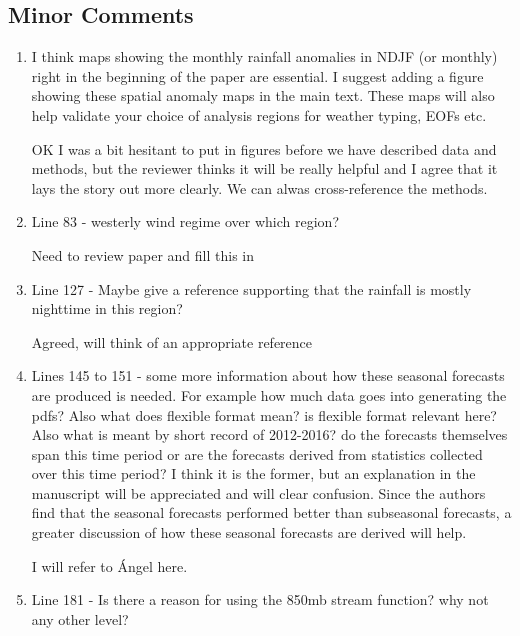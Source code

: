 \documentclass{article}
\newenvironment{answer}{\begin{mdframed}}{\end{mdframed}}
\begin{document}
\subsection{Minor Comments}

\begin{enumerate}
	\item I think maps showing the monthly rainfall anomalies in NDJF (or monthly) right in the beginning of the paper are essential. I suggest adding a figure showing these spatial anomaly maps in the main text. These maps will also help validate your choice of analysis regions for weather typing, EOFs etc.
	\begin{answer}
		OK I was a bit hesitant to put in figures before we have described data and methods, but the reviewer thinks it will be really helpful and I agree that it lays the story out more clearly.
		We can alwas cross-reference the methods.
	\end{answer}
	\item Line 83 - westerly wind regime over which region?
	\begin{answer}
		Need to review paper and fill this in
	\end{answer}
	\item Line 127 - Maybe give a reference supporting that the rainfall is mostly nighttime in this region?
	\begin{answer}
		Agreed, will think of an appropriate reference
	\end{answer}
	\item Lines 145 to 151 - some more information about how these seasonal forecasts are produced is needed. For example how much data goes into generating the pdfs? Also what does flexible format mean? is flexible format relevant here? Also what is meant by short record of 2012-2016? do the forecasts themselves span this time period or are the forecasts derived from statistics collected over this time period? I think it is the former, but an explanation in the manuscript will be appreciated and will clear confusion. Since the authors find that the seasonal forecasts performed better than subseasonal forecasts, a greater discussion of how these seasonal forecasts are derived will help.
	\begin{answer}
		I will refer to \'{A}ngel here.
	\end{answer}
	\item Line 181  - Is there a reason for using the 850mb stream function? why not any other level?
	\begin{answer}

\end{answer}
\end{enumerate}
\end{document}
